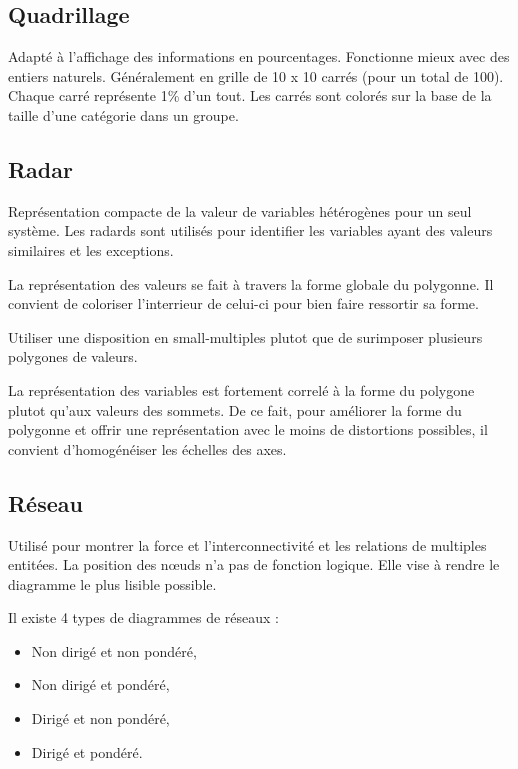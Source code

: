 \documentclass[a4paper,12pt]{article}
\begin{document}
\begin{multicols}{2}
\subsection*{Quadrillage}
\label{sec:orgae8c5ca}
Adapté à l'affichage des informations en pourcentages. Fonctionne mieux avec des entiers naturels. \autocite{alansmithLexiqueVisuel} Généralement en grille de 10 x 10 carrés (pour un total de 100). Chaque carré représente 1\% d'un tout. Les carrés sont colorés sur la base de la taille d'une catégorie dans un groupe. \autocite{mikeyiHowChooseRight2020}
\subsection*{Radar}
\label{sec:orgfd28f05}
Représentation compacte de la valeur de variables hétérogènes pour un seul système. \autocite{alansmithLexiqueVisuel} Les radards sont utilisés pour identifier les variables ayant des valeurs similaires et les exceptions. \autocite{sosulskiGraphics2019}

La représentation des valeurs se fait à travers la forme globale du polygonne. Il convient de coloriser l'interrieur de celui-ci pour bien faire ressortir sa forme. \autocite{jonathanschwabishRelationship2021}

Utiliser une disposition en small-multiples plutot que de surimposer plusieurs polygones de valeurs. \autocite{jonathanschwabishRelationship2021}

La représentation des variables est fortement correlé à la forme du polygone plutot qu'aux valeurs des sommets. \autocite{sosulskiGraphics2019} De ce fait, pour améliorer la forme du polygonne et offrir une représentation avec le moins de distortions possibles, il convient d'homogénéiser les échelles des axes.
\subsection*{Réseau}
\label{sec:orgdd17690}
Utilisé pour montrer la force et l'interconnectivité et les relations de multiples entitées. \autocite{alansmithLexiqueVisuel} La position des nœuds n’a pas de fonction logique. Elle vise à rendre le diagramme le plus lisible possible. \autocite{mikeyiHowChooseRight2020}



Il existe 4 types de diagrammes de réseaux : \autocite{jonathanschwabishRelationship2021}
\begin{itemize}
\item Non dirigé et non pondéré,
\item Non dirigé et pondéré,
\item Dirigé et non pondéré,
\item Dirigé et pondéré.
\end{itemize}

\end{multicols}
\end{document}
